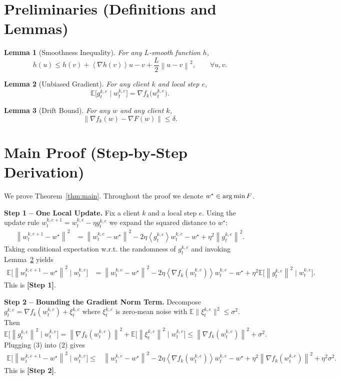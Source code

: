 \documentclass{article}
\newtheorem{lemma}{Lemma}
\newcommand{\E}{\mathbb{E}}
\newcommand{\norm}[1]{\left\|#1\right\|}
\newcommand{\inner}[1]{\left\langle #1 \right\rangle}
\newcommand{\argmin}{\operatornamewithlimits{arg\,min}}
\newcommand{\grad}{\nabla}
\begin{document}
\section*{Preliminaries (Definitions and Lemmas)}
\begin{lemma}[Smoothness Inequality]\label{lem:smooth}
For any $L$‑smooth function $h$,
\[
h(u)\le h(v)+\inner{\grad h(v)}{u-v}+\frac{L}{2}\norm{u-v}^{2},\qquad \forall u,v.
\]
\end{lemma}
\begin{lemma}[Unbiased Gradient]\label{lem:unbiased}
For any client $k$ and local step $e$,
\[
\E\!\bigl[g_{t}^{k,e}\mid w_{t}^{k,e}\bigr]=\grad f_k\!\bigl(w_{t}^{k,e}\bigr).
\]
\end{lemma}
\begin{lemma}[Drift Bound]\label{lem:drift}
For any $w$ and any client $k$,
\[
\norm{\grad f_k(w)-\grad F(w)}\le\delta .
\]
\end{lemma}

\section*{Main Proof (Step‑by‑Step Derivation)}
We prove Theorem~\ref{thm:main}. Throughout the proof we denote $w^\star\in\argmin F$.

\bigskip
\noindent\textbf{Step 1 – One Local Update.}  
Fix a client $k$ and a local step $e$. Using the update rule
$w_{t}^{k,e+1}=w_{t}^{k,e}-\eta g_{t}^{k,e}$ we expand the squared distance to $w^\star$:
\begin{align}
\norm{w_{t}^{k,e+1}-w^\star}^{2}
&=\norm{w_{t}^{k,e}-w^\star}^{2}
   -2\eta\inner{g_{t}^{k,e}}{w_{t}^{k,e}-w^\star}
   +\eta^{2}\norm{g_{t}^{k,e}}^{2}. \tag{1}
\end{align}
Taking conditional expectation w.r.t. the randomness of $g_{t}^{k,e}$ and invoking Lemma~\ref{lem:unbiased} yields
\begin{align}
\E\!\bigl[\norm{w_{t}^{k,e+1}-w^\star}^{2}\mid w_{t}^{k,e}\bigr]
&=\norm{w_{t}^{k,e}-w^\star}^{2}
   -2\eta\inner{\grad f_k(w_{t}^{k,e})}{w_{t}^{k,e}-w^\star}
   +\eta^{2}\E\!\bigl[\norm{g_{t}^{k,e}}^{2}\mid w_{t}^{k,e}\bigr]. \tag{2}
\end{align}
This is \textbf{[Step 1]}.

\bigskip
\noindent\textbf{Step 2 – Bounding the Gradient Norm Term.}  
Decompose $g_{t}^{k,e}= \grad f_k(w_{t}^{k,e})+\xi_{t}^{k,e}$ where $\xi_{t}^{k,e}$ is zero‑mean noise with $\E\|\xi_{t}^{k,e}\|^{2}\le\sigma^{2}$. Then
\[
\E\!\bigl[\norm{g_{t}^{k,e}}^{2}\mid w_{t}^{k,e}\bigr]
= \norm{\grad f_k(w_{t}^{k,e})}^{2}+\E\!\bigl[\norm{\xi_{t}^{k,e}}^{2}\mid w_{t}^{k,e}\bigr]
\le \norm{\grad f_k(w_{t}^{k,e})}^{2}+\sigma^{2}. \tag{3}
\]
Plugging (3) into (2) gives
\begin{align}
\E\!\bigl[\norm{w_{t}^{k,e+1}-w^\star}^{2}\mid w_{t}^{k,e}\bigr]
\le &\norm{w_{t}^{k,e}-w^\star}^{2}
   -2\eta\inner{\grad f_k(w_{t}^{k,e})}{w_{t}^{k,e}-w^\star}
   +\eta^{2}\norm{\grad f_k(w_{t}^{k,e})}^{2}
   +\eta^{2}\sigma^{2}. \tag{4}
\end{align}
This is \textbf{[Step 2]}.
\end{document}
